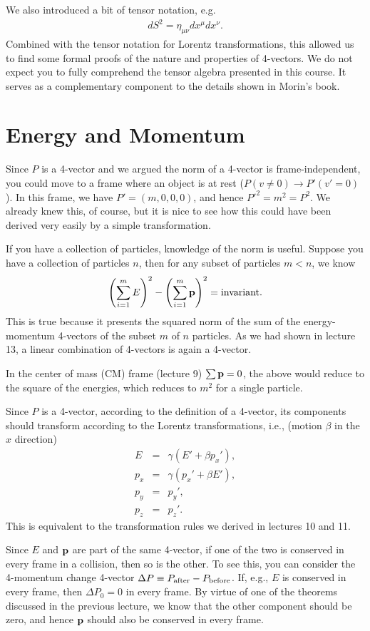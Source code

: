 \documentclass[12pt]{article}
\newcommand{\be}{\begin{eqnarray}}
\newcommand{\ee}{\end{eqnarray}}
\begin{document}
We also introduced a bit of tensor notation, e.g. 
\be
dS^2 = \eta_{\mu \nu} dx^{\mu} dx^{\nu}.
\ee
Combined with the tensor notation for Lorentz transformations, this allowed us to find some formal proofs of the nature and properties of 4-vectors. We do not expect you to fully comprehend the tensor algebra presented in this course. It serves as a complementary component to the details shown in Morin's book. 


\section{Energy and Momentum}\label{sec:E&M}

Since $P$ is a 4-vector and we argued the norm of a 4-vector is frame-independent, you could move to a frame where an object is at rest ($P(v\neq 0) \rightarrow P'(v' = 0)$). In this frame, we have $P' = (m,0,0,0)$, and hence $P'^2 = m^2 = P^2$. We already knew this, of course, but it is nice to see how this could have been derived very easily by a simple transformation. 

If you have a collection of particles, knowledge of the norm is useful. Suppose you have a collection of particles $n$, then for any subset of particles $m<n$, we know 
\be
\left(\sum_{i = 1}^m E\right)^2 - \left( \sum_{i=1}^m {\bf p}\right)^2 = {\rm invariant}.
\ee
This is true because it presents the squared norm of the sum of the energy-momentum 4-vectors of the subset $m$ of $n$ particles. As we had shown in lecture 13, a linear combination of 4-vectors is again a 4-vector. 

In the center of mass (CM) frame (lecture 9) $\sum {\bf p} = 0$, the above would reduce to the square of the energies, which reduces to $m^2$ for a single particle. 

Since $P$ is a 4-vector, according to the definition of a 4-vector, its components should transform according to the Lorentz transformations, i.e., (motion $\beta$ in the $x$ direction) 
\be
E &=& \gamma(E' + \beta p_x'),\nonumber \\
p_x &=& \gamma(p_x'+\beta E'), \nonumber \\
p_y &=& p_y', \nonumber \\
p_z &=& p_z' .
\ee
This is equivalent to the transformation rules we derived in lectures 10 and 11. 

Since $E$ and $\bf p$ are part of the same 4-vector, if one of the two is conserved in every frame in a collision, then so is the other. To see this, you can consider the 4-momentum change 4-vector $\Delta P \equiv P_{\rm after}-P_{\rm before}$. If, e.g., $E$ is conserved in every frame, then $\Delta P_0 = 0$ in every frame. By virtue of one of the theorems discussed in the previous lecture, we know that the other component should be zero, and hence ${\bf p}$ should also be conserved in every frame. 
\end{document}
